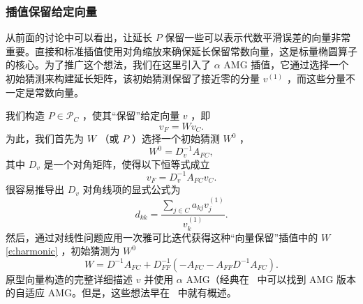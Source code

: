 \documentclass[12pt]{acta_2011xz}
\begin{document}
   \subsubsection{插值保留给定向量  }     

从前面的讨论中可以看出，让延长    $P$    保留一些可以表示代数平滑误差的向量非常重要。直接和标准插值使用对角缩放来确保延长保留常数向量，这是标量椭圆算子的核心。为了推广这个想法，我们在这里引入了    $\alpha$    AMG 插值，它通过选择一个初始猜测来构建延长矩阵，该初始猜测保留了接近零的分量    $v^{(1)}$    ，而这些分量不一定是常数向量。  

我们构造    $P\in \mathcal{P}_C$    ，使其“保留”给定向量    $v$    ，即
   \begin{equation*}
    v_F=Wv_C.
\end{equation*}    为此，我们首先为    $W$   （或    $P$    ）选择一个初始猜测    $W^0$    ，
   \begin{equation}\label{aAMG_W0}
W^0=D_v^{-1}A_{FC},
\end{equation}    其中    $D_v$    是一个对角矩阵，使得以下恒等式成立
   \begin{equation*}
v_F=D_v^{-1}A_{FC}v_C.
\end{equation*}    很容易推导出    $D_v$    对角线项的显式公式为
   \begin{equation*}
    d_{kk}=\frac{\sum_{j\in C}a_{kj}v_j^{(1)}}{v_k^{(1)}}.
\end{equation*}    然后，通过对线性问题应用一次雅可比迭代获得这种“向量保留”插值中的    $W$    ~    \eqref{e:harmonic}    ，初始猜测为    $W^0$    
   \begin{equation*}\label{aAMG_W}
    W=D^{-1}A_{FC}+D_{FF}^{-1}(-A_{FC}-A_{FF}D^{-1}A_{FC}).
\end{equation*}    原型向量构造的完整详细描述
   $v$    并使用
   $\alpha$    AMG（经典在~    \cite{aAMG}    中可以找到 AMG 版本的自适应 AMG。但是，这些想法早在~    \cite{1stAMG}    中就有概述。  
\end{document}
